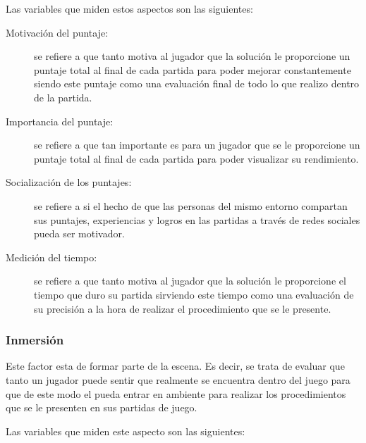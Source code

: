 Las variables que miden estos aspectos son las siguientes:

\begin{description}

\item[Motivación del puntaje:] se refiere a que tanto motiva al jugador que la
    solución le proporcione un puntaje total al final de cada partida para poder
    mejorar constantemente siendo este puntaje como una evaluación final de todo
    lo que realizo dentro de la partida.

\item[Importancia del puntaje:] se refiere a que tan importante es para un
    jugador que se le proporcione un puntaje total al final de cada partida para
    poder visualizar su rendimiento.

\item[Socialización de los puntajes:] se refiere a si el hecho de que las
    personas del mismo entorno compartan sus puntajes, experiencias y logros en
    las partidas a través de redes sociales pueda ser motivador.

\item[Medición del tiempo:] se refiere a que tanto motiva al
    jugador que la solución le proporcione el tiempo que duro su partida
    sirviendo este tiempo como una evaluación de su precisión a la hora de
    realizar el procedimiento que se le presente.

\end{description} 


\subsubsection{Inmersión}
\label{sec:sub_inmersion}

Este factor esta  de formar
parte de la escena. Es decir, se trata de evaluar que tanto un jugador puede
sentir que realmente se encuentra dentro del juego para que de este modo el
pueda entrar en ambiente para realizar los procedimientos que se le presenten en
sus partidas de juego.

Las variables que miden este aspecto son las siguientes:

